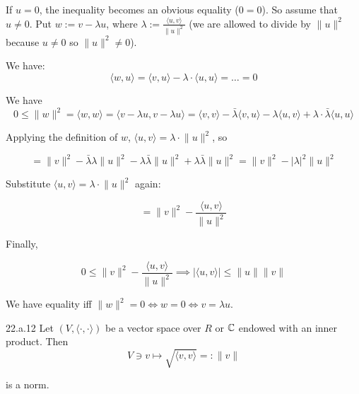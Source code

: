 \documentclass[12pt]{article}
\begin{document}
\begin{proofbox}
    If $u = 0$, the inequality becomes an obvious equality ($0 = 0$). So assume that $u \neq 0$. Put $w := v - \lambda u$, where $\lambda := \frac{\langle u, v \rangle}{\lVert u \rVert^2}$ (we are allowed to divide by $\lVert u \rVert^2$ because $u \neq 0$ so $\lVert u \rVert^2 \neq 0$).

    We have:
    $$
        \langle w, u \rangle = \langle v, u \rangle - \lambda \cdot \langle u, u \rangle = \dots = 0
    $$

    We have 
    $$
        0 \leq \lVert w \rVert^2 = \langle w, w \rangle = \langle v-\lambda u, v - \lambda u \rangle = \langle v, v \rangle - \bar{\lambda}\langle v, u \rangle - \lambda \langle u, v \rangle + \lambda \cdot \bar{\lambda} \langle u, u \rangle
    $$

    Applying the definition of $w$, $\langle u, v \rangle = \lambda \cdot \lVert u \rVert^2$, so

    $$
        = \lVert v \rVert^2 - \bar{\lambda} \lambda \lVert u \rVert^2 - \lambda \bar{\lambda}\lVert u \rVert^2 + \lambda \bar{\lambda}\lVert u \rVert^2 = \lVert v \rVert^2 - |\lambda|^2 \lVert u \rVert^2
    $$

    Substitute $\langle u, v \rangle = \lambda \cdot \lVert u \rVert^2$ again:

    $$
        = \lVert v \rVert^2 - \frac{\langle u, v \rangle}{\lVert u \rVert^2}
    $$

    Finally,

    $$
        0 \leq \lVert v \rVert^2 - \frac{\langle u, v \rangle}{\lVert u \rVert^2} \implies |\langle u, v \rangle| \leq \lVert u \rVert \lVert v \rVert
    $$

    We have equality iff $\lVert w \rVert^2 = 0 \iff w = 0 \iff v = \lambda u$.
\end{proofbox}

\begin{corollary}{}{22.a.12}
    Let $(V, \langle \cdot, \cdot \rangle)$ be a vector space over $R$ or $\mathbb{C}$ endowed with an inner product. Then
    $$
        V \ni v \mapsto \sqrt{\langle v, v \rangle} =: \lVert v \rVert
    $$

    is a norm.
\end{corollary}
\end{document}
